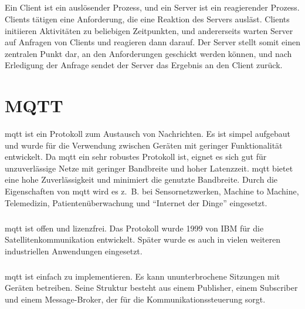 \subparagraph{}
Ein Client ist ein auslösender Prozess, und ein Server ist ein reagierender
Prozess. Clients tätigen eine Anforderung, die eine Reaktion des Servers
ausläst. Clients initiieren Aktivitäten zu beliebigen Zeitpunkten, und
andererseits warten Server auf Anfragen von Clients und reagieren dann darauf.
Der Server stellt somit einen zentralen Punkt dar, an den Anforderungen
geschickt werden können, und nach Erledigung der Anfrage sendet der Server das
Ergebnis an den Client zurück.
\cite{Bengel2015}

\section{MQTT}\label{sec:mqtt}
\ac{mqtt} ist ein Protokoll zum Austausch von Nachrichten. Es ist simpel
aufgebaut und wurde für die Verwendung zwischen Geräten mit geringer
Funktionalität entwickelt. Da \ac{mqtt} ein sehr robustes Protokoll ist, eignet
es sich gut für unzuverlässige Netze mit geringer Bandbreite und hoher
Latenzzeit. \ac{mqtt} bietet eine hohe Zuverlässigkeit und minimiert die
genutzte Bandbreite. Durch die Eigenschaften von \ac{mqtt} wird es z.~B. bei
Sensornetzwerken, Machine to Machine, Telemedizin, Patientenüberwachung und
"`Internet der Dinge"' eingesetzt.

\subparagraph{}
\ac{mqtt} ist offen und lizenzfrei. Das Protokoll wurde 1999 von IBM für die
Satellitenkommunikation entwickelt. Später wurde es auch in vielen weiteren
industriellen Anwendungen eingesetzt.

\subparagraph{}
\ac{mqtt} ist einfach zu implementieren. Es kann ununterbrochene Sitzungen mit
Geräten betreiben. Seine Struktur besteht aus einem Publisher, einem Subscriber
und einem Message-Broker, der für die Kommunikationssteuerung sorgt.
\cite{dennisseidel2018}
